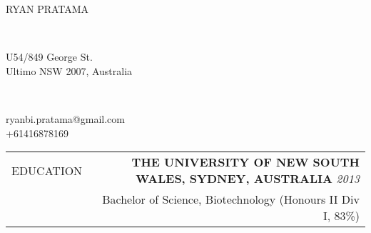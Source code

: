 \documentclass[a4paper,10pt]{article}
\newcommand\VRule{\color{lightgray}\vrule}
\newcommand\HRule{}
\begin{document}

\noindent\makebox[\linewidth]{\rule{\paperwidth}{0.15in}}
\vspace{0.10in}

%

\begin{minipage}[c]{0.4\textwidth}
\Huge \cabincondensed \uppercase{Ryan Pratama}
\end{minipage}
\begin{minipage}[c]{0.025\textwidth}
\\
\end{minipage}
\begin{minipage}[c]{0.275\textwidth}
 U54/849 George St.\\
Ultimo NSW 2007, Australia
\end{minipage}
\begin{minipage}[c]{0.03\textwidth}
\\
\phone
\end{minipage}
\begin{minipage}[c]{0.27\textwidth}
 ryanbi.pratama@gmail.com\\
 +61416878169
\end{minipage}


\vspace{0.25in}


\begin{tabular}{L!{\VRule}R}
\uppercase{Education} \HRule & \textbf{\uppercase{The University of New South Wales, Sydney, Australia}} \hfill\small \textit{2013}\\
 & {Bachelor of Science, Biotechnology (Honours II Div I, 83\%)}\\
\end{tabular}
\end{document}

